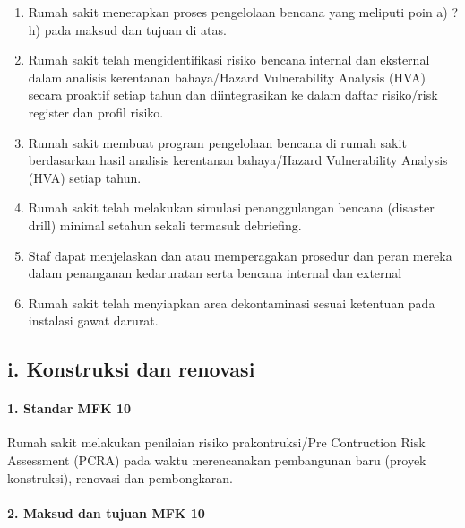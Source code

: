 \documentclass[
]{book}
\providecommand{\tightlist}{%
  \setlength{\itemsep}{0pt}\setlength{\parskip}{0pt}}
\begin{document}
\begin{enumerate}
\def\labelenumi{\alph{enumi}.}
\tightlist
\item
  Rumah sakit menerapkan proses pengelolaan bencana yang meliputi poin a) ? h) pada maksud dan tujuan di atas.
\item
  Rumah sakit telah mengidentifikasi risiko bencana internal dan eksternal dalam analisis kerentanan bahaya/Hazard Vulnerability Analysis (HVA) secara proaktif setiap tahun dan diintegrasikan ke dalam daftar risiko/risk register dan profil risiko.
\item
  Rumah sakit membuat program pengelolaan bencana di rumah sakit berdasarkan hasil analisis kerentanan bahaya/Hazard Vulnerability Analysis (HVA) setiap tahun.
\item
  Rumah sakit telah melakukan simulasi penanggulangan bencana (disaster drill) minimal setahun sekali termasuk debriefing.
\item
  Staf dapat menjelaskan dan atau memperagakan prosedur dan peran mereka dalam penanganan kedaruratan serta bencana internal dan external
\item
  Rumah sakit telah menyiapkan area dekontaminasi sesuai ketentuan pada instalasi gawat darurat.
\end{enumerate}

\hypertarget{i.-konstruksi-dan-renovasi}{%
\subsection*{i. Konstruksi dan renovasi}\label{i.-konstruksi-dan-renovasi}}

\hypertarget{standar-mfk-10}{%
\paragraph*{1. Standar MFK 10}\label{standar-mfk-10}}

Rumah sakit melakukan penilaian risiko prakontruksi/Pre Contruction Risk Assessment (PCRA) pada waktu merencanakan pembangunan baru (proyek konstruksi), renovasi dan pembongkaran.

\hypertarget{maksud-dan-tujuan-mfk-10}{%
\paragraph*{2. Maksud dan tujuan MFK 10}\label{maksud-dan-tujuan-mfk-10}}
\end{document}
